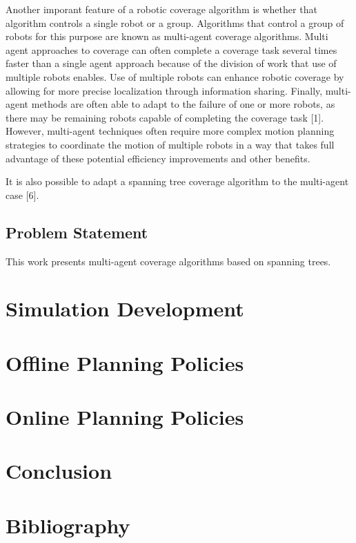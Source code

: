 \documentclass[letterpaper, 12pt, leqno]{report}
\begin{document}
Another imporant feature of a robotic coverage algorithm is whether that algorithm controls a single robot or a group. Algorithms that control a group of robots for this purpose are known as multi-agent coverage algorithms. Multi agent approaches to coverage can often complete a coverage task several times faster than a single agent approach because of the division of work that use of multiple robots enables. Use of multiple robots can enhance robotic coverage by allowing for more precise localization through information sharing. Finally, multi-agent methods are often able to adapt to the failure of one or more robots, as there may be remaining robots capable of completing the coverage task [1]. However, multi-agent techniques often require more complex motion planning strategies to coordinate the motion of multiple robots in a way that takes full advantage of these potential efficiency improvements and other benefits.

It is also possible to adapt a spanning tree coverage algorithm to the multi-agent case [6].

\section{Problem Statement}

This work presents multi-agent coverage algorithms based on spanning trees.


\chapter{Simulation Development}

\chapter{Offline Planning Policies}

\chapter{Online Planning Policies}

\chapter{Conclusion}

\chapter{Bibliography}
\end{document}
